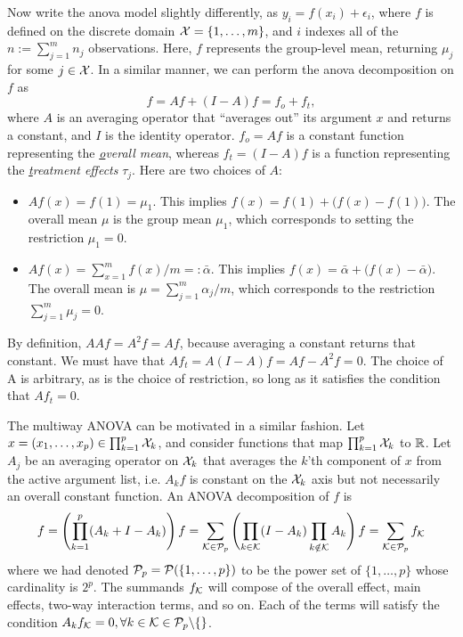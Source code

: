 
Now write the \gls*{anova} model slightly differently, as $y_{i} = f(x_i) + \epsilon_{i}$, where $f$ is defined on the discrete domain ${\mathcal X} = \{1,\dots,m\}$, and $i$ indexes all of the $n := \sum_{j=1}^m n_j$ observations.
Here, $f$ represents the group-level mean, returning $\mu_j$ for some $j\in{\mathcal X}$.
In a similar manner, we can perform the \gls*{anova} decomposition on $f$ as
\[
  f = Af + (I-A)f = f_o + f_t,
\]
where $A$ is an averaging operator that ``averages out'' its argument $x$ and returns a constant, and $I$ is the identity operator.
$f_o = Af$ is a constant function representing the \textit{\underline{o}verall mean}, whereas $f_t = (I - A)f$ is a function representing the \textit{\underline{t}reatment effects} $\tau_j$.
Here are two choices of $A$:
\begin{itemize}
  \item {\boldmath$Af(x) = f(1) = \mu_1$}. This implies $f(x) = f(1) + \big(f(x) - f(1)\big)$. The overall mean $\mu$ is the group mean $\mu_1$, which corresponds to setting the restriction $\mu_1=0$.
  \item {\boldmath$Af(x) = \sum_{x=1}^m f(x) / m =: \bar \alpha$}. This implies $f(x) = \bar \alpha + \big( f(x) - \bar \alpha \big)$. The overall mean is $\mu = \sum_{j=1}^m \alpha_j/m$, which corresponds to the restriction $\sum_{j=1}^m \mu_j = 0$.
\end{itemize}
By definition, $AAf = A^2f = Af$, because averaging a constant returns that constant.
We must have that $Af_t = A(I - A)f = Af - A^2f = 0$.
The choice of A is arbitrary, as is the choice of restriction, so long as it satisfies the condition that $Af_t = 0$.

The multiway ANOVA can be motivated in a similar fashion. 
Let $x = (x_1,\dots,x_p) \in \prod_{k=1}^p {\mathcal X}_k$, and consider functions that map $\prod_{k=1}^p {\mathcal X}_k$ to $\mathbb{R}$.
Let $A_j$ be an averaging operator on ${\mathcal X}_k$ that averages the $k$'th component of $x$ from the active argument list, i.e. $A_kf$ is constant on the ${\mathcal X}_k$ axis but not necessarily an overall constant function.
An ANOVA decomposition of $f$ is
\begin{equation}
  f = \left( \prod_{k=1}^p (A_k + I - A_k) \right)f = \sum_{{\mathcal K}\in{\mathcal P}_p} \left( \prod_{k\in{\mathcal K}} (I - A_k) \prod_{k\notin{\mathcal K}} A_k \right)f = \sum_{{\mathcal K}\in{\mathcal P}_p} f_{\mathcal K}
\end{equation}
where we had denoted ${\mathcal P}_p = {\mathcal P}(\{1,\dots,p\})$ to be the power set of $\{1,\dots,p\}$ whose cardinality is $2^p$.
The summands $f_{\mathcal K}$ will compose of the overall effect, main effects, two-way interaction terms, and so on.
Each of the terms will satisfy the condition $A_kf_{\mathcal K} = 0, \forall k \in {\mathcal K} \in {\mathcal P}_p \backslash \{\}$.

